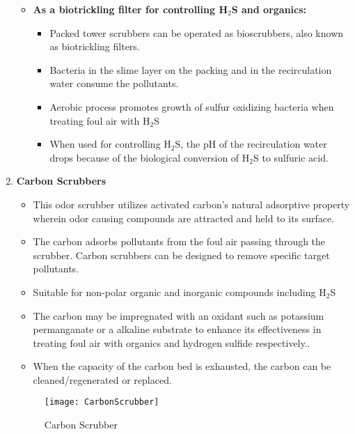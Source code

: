 \begin{enumerate}
\begin{itemize}
\item \textbf{As a biotrickling filter for controlling H$_2$S and organics:}\\
\begin{itemize} 
\item Packed tower scrubbers can be operated as bioscrubbers, also known as biotrickling filters.
\item Bacteria in the slime layer on the packing and in the recirculation water consume the pollutants.
\item Aerobic process promotes growth of sulfur oxidizing bacteria when treating foul air with H$_2$S
\item When used for controlling H$_2$S, the pH of the recirculation water drops because of the biological conversion of H$_2$S to sulfuric acid.
\end{itemize}
\end{itemize}
\item \textbf{Carbon Scrubbers}
\begin{itemize}
\item This odor scrubber utilizes activated carbon’s natural adsorptive property wherein odor causing compounds are attracted and held to its surface.
\item The carbon adsorbs pollutants from the foul air passing through the scrubber.
Carbon scrubbers can be designed to remove specific target pollutants.
\item Suitable for non-polar organic and inorganic compounds including H$_2$S
\item The carbon may be impregnated with an oxidant such as potassium permanganate or a alkaline substrate to enhance its effectiveness in treating foul air with organics and hydrogen sulfide respectively..
\item When the capacity of the carbon bed is exhausted, the carbon can be cleaned/regenerated or replaced.
\end{itemize}

\begin{figure}[htp]
	\begin{center}
		\texttt{[image: CarbonScrubber]}
			\caption{Carbon Scrubber}
	\end{center}
	

\end{figure}
\end{enumerate}
